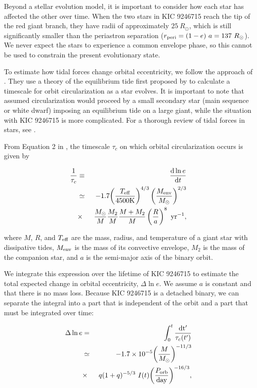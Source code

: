 Beyond a stellar evolution model, it is important to consider how each star has affected the other over time. When the two stars in KIC 9246715 reach the tip of the red giant branch, they have radii of approximately $25 \ R_\odot$, which is still significantly smaller than the periastron separation ($r_{\rm{peri}} = (1-e)~a = 137 \ R_\odot$). We never expect the stars to experience a common envelope phase, so this cannot be used to constrain the present evolutionary state.

To estimate how tidal forces change orbital eccentricity, we follow the approach of \citet{ver95}. They use a theory of the equilibrium tide first proposed by \citet{zah77} to calculate a timescale for orbit circularization as a star evolves. It is important to note that \citet{ver95} assumed circularization would proceed by a small secondary star (main sequence or white dwarf) imposing an equilibrium tide on a large giant, while the situation with KIC 9246715 is more complicated. For a thorough review of tidal forces in stars, see \citet{ogi14}.

From Equation 2 in \citet{ver95}, the timescale $\tau_c$ on which orbital circularization occurs is given by

\begin{eqnarray}
\frac{1}{\tau_c} & \equiv &
\frac{{\rm{d}} \ln e} {{\rm{d}} t} \nonumber \\
& \simeq & -1.7 {\left( \frac{T_{\rm{eff}}}{4500 \rm{K}} \right)}^{4/3} \left( \frac{M_{\rm{env}}}{M_{\odot}} \right)^{2/3} \\
& \times & \ \frac{M_{\odot}}{M} \frac{M_2}{M} \frac{M+M_2}{M} \left( \frac{R}{a} \right)^8 \ \rm{yr}^{-1}, \nonumber
\end{eqnarray}

\noindent where $M$, $R$, and $T_{\rm{eff}}$ are the mass, radius, and temperature of a giant star with dissipative tides, $M_{\rm{env}}$ is the mass of its convective envelope, $M_2$ is the mass of the companion star, and $a$ is the semi-major axis of the binary orbit.

We integrate this expression over the lifetime of KIC 9246715 to estimate the total expected change in orbital eccentricity, $\Delta \ln e$. We assume $a$ is constant and that there is no mass loss. Because KIC 9246715 is a detached binary, we can separate the integral into a part that is independent of the orbit and a part that must be integrated over time:

\begin{eqnarray}\label{tide1}
\Delta \ln e  & = &
\int_0^t \frac{\rm{d}t'}{\tau_c(t')} \nonumber \\
& \simeq & -1.7 \times 10^{-5} {\left( \frac{M}{M_{\odot}} \right)}^{-11/3} \\
& \times & \ q(1+q)^{-5/3} \ I(t) {\left( \frac{P_{\rm{orb}}}{\rm{day}} \right)}^{-16/3}, \nonumber
\end{eqnarray}

